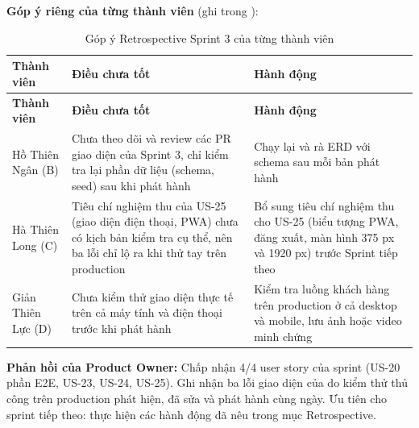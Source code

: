 \textbf{Góp ý riêng của từng thành viên} (ghi trong ):
\begin{longtable}{@{}L{2.4cm}L{6cm}L{5.4cm}@{}}
\caption{Góp ý Retrospective Sprint 3 của từng thành viên}\label{tab:retro3}\\
\toprule
\textbf{Thành viên} & \textbf{Điều chưa tốt} & \textbf{Hành động} \\ \midrule \endfirsthead
\toprule \textbf{Thành viên} & \textbf{Điều chưa tốt} & \textbf{Hành động} \\ \midrule \endhead
\bottomrule \endfoot
Hồ Thiên Ngân (B) & Chưa theo dõi và review các PR giao diện của Sprint 3, chỉ kiểm tra lại phần dữ liệu (schema, seed) sau khi phát hành & Chạy lại  và rà ERD với schema sau mỗi bản phát hành \\
Hà Thiên Long (C) & Tiêu chí nghiệm thu của US-25 (giao diện điện thoại, PWA) chưa có kịch bản kiểm tra cụ thể, nên ba lỗi chỉ lộ ra khi thử tay trên production & Bổ sung tiêu chí nghiệm thu cho US-25 (biểu tượng PWA, đăng xuất, màn hình 375 px và 1920 px) trước Sprint tiếp theo \\
Giản Thiên Lực (D) & Chưa kiểm thử giao diện thực tế trên cả máy tính và điện thoại trước khi phát hành & Kiểm tra luồng khách hàng trên production ở cả desktop và mobile, lưu ảnh hoặc video minh chứng \\
\end{longtable}

\textbf{Phản hồi của Product Owner:} Chấp nhận 4/4 user story của sprint (US-20 phần E2E, US-23, US-24, US-25). Ghi nhận ba lỗi giao diện của  do kiểm thử thủ công trên production phát hiện, đã sửa và phát hành  cùng ngày. Ưu tiên cho sprint tiếp theo: thực hiện các hành động đã nêu trong mục Retrospective.